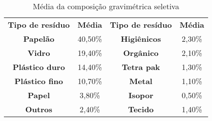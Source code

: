 \begin{table}[htbp]
  \centering
  \caption{Média da composição gravimétrica seletiva}
	\begin{tabular}{c|c|c|c}
		\rowcolor[rgb]{ .969,  .588,  .275} \textcolor[rgb]{ 1,  1,  1}{\textbf{Tipo de resíduo}} & \textcolor[rgb]{ 1,  1,  1}{\textbf{Média}} & \textcolor[rgb]{ 1,  1,  1}{\textbf{Tipo de resíduo}} & \textcolor[rgb]{ 1,  1,  1}{\textbf{Média}} \\
		\rowcolor[rgb]{ .984,  .831,  .706} \textbf{Papelão} & 40,50\% & \textbf{Higiênicos} & 2,30\% \\
		\rowcolor[rgb]{ .992,  .914,  .851} \textbf{Vidro} & 19,40\% & \textbf{Orgânico} & 2,10\% \\
		\rowcolor[rgb]{ .984,  .831,  .706} \textbf{Plástico duro} & 14,40\% & \textbf{Tetra pak} & 1,30\% \\
		\rowcolor[rgb]{ .992,  .914,  .851} \textbf{Plástico fino} & 10,70\% & \textbf{Metal} & 1,10\% \\
		\rowcolor[rgb]{ .984,  .831,  .706} \textbf{Papel} & 3,80\% & \textbf{Isopor} & 0,50\% \\
		\rowcolor[rgb]{ .992,  .914,  .851} \textbf{Outros} & 2,40\% & \textbf{Tecido} & 1,40\% \\
	\end{tabular}%
  \label{tab:grav_seletiva_media}%
\end{table}%
